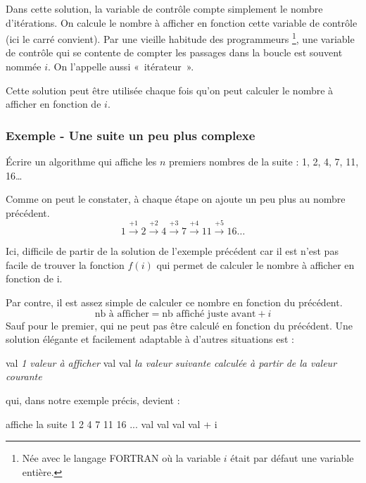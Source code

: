 		Dans cette solution,
		la variable de contrôle compte simplement le nombre d’itérations.
		On calcule le nombre à afficher en fonction cette variable de contrôle 
		(ici le carré convient).
		Par une vieille habitude des programmeurs%
		\footnote{%
			Née avec le langage FORTRAN 
			où la variable $i$ était par défaut une variable entière.
		},
		une variable de contrôle 
		qui se contente de compter les passages dans la boucle 
		est souvent nommée $i$. 
		On l’appelle aussi «~itérateur~».	

		Cette solution peut être utilisée
		chaque fois qu'on peut calculer le nombre à afficher
		en fonction de $i$.
		
	\subsubsection{Exemple - Une suite un peu plus complexe}
	 
		Écrire un algorithme qui affiche 
		les $n$ premiers nombres de la suite :
		1, 2, 4, 7, 11, 16\dots{}
		
		Comme on peut le constater, 
		à chaque étape on ajoute un peu plus au nombre précédent.
		\[ 
			1 
			\xrightarrow{+1} 2 
			\xrightarrow{+2} 4
			\xrightarrow{+3} 7 
			\xrightarrow{+4} 11 
			\xrightarrow{+5} 16 
			\dots
		\] 

		Ici, difficile de partir de la solution de l'exemple précédent
		car il est n'est pas facile de trouver la fonction $f(i)$
		qui permet de calculer le nombre à afficher en fonction de i. 
		
		Par contre, il est assez simple de calculer ce nombre 
		en fonction du précédent.
		\[
			\mbox{nb à afficher} = \mbox{nb affiché juste avant} + i
		\]
		Sauf pour le premier, qui ne peut pas être calculé
		en fonction du précédent.
		Une solution élégante et facilement adaptable
		à d'autres situations est :
		
		\begin{LDA}
				\Let val \Gets \textit{1\iere{} valeur à afficher}
					\Write val
					\Let val \Gets \textit{la valeur suivante calculée à partir de la valeur courante}
				\EndFor
			\EndAlgo
		\end{LDA}
		
		qui, dans notre exemple précis, devient :

		\begin{LDA}
			\LComment affiche la suite 1 2 4 7 11 16 ...
			\Algo{suite}{\Par{n}{entier}}{}
				\Decl{val}{entier}
				\Let val \Gets 1
				\For{i}{1}{n}
					\Write val
					\Let val \Gets val + i
				\EndFor
			\EndAlgo
		\end{LDA}

